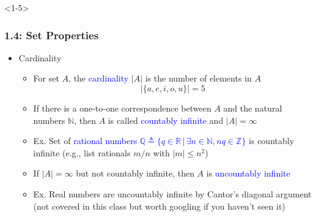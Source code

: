 \documentclass[10pt,english,aspectratio=169]{beamer}
\begin{document}
\iffalse
\begin{frame}{Intervals?}

\begin{itemize}
\setlength\itemsep{3mm}
\item<1-> Defining Sets \vspace{1mm}
\begin{itemize} 
  \setlength\itemsep{1.5mm}


\end{itemize}
\end{itemize}
\end{frame}
\fi

\begin{frame}<1-5> \frametitle{1.4: Set Properties}

\begin{itemize}
\setlength\itemsep{3mm}

\item<1-> Cardinality \vspace{1mm}
\begin{itemize} 
  \setlength\itemsep{2mm}
  \item<1-> For set $A$, the \textcolor{blue}{cardinality} $|A|$ is the number of elements in $A$
  \[ |\{ a,e,i,o,u \}| = 5 \]
  \item<2-> If there is a one-to-one correspondence between $A$ and the natural numbers $\mathbb{N}$, then $A$ is called \textcolor{blue}{countably infinite} and  $|A| = \infty$
  \item<3-> Ex. Set of \textcolor{blue}{rational numbers $\mathbb{Q} \triangleq \{ q \in \mathbb{R} \,|\, \exists n \in \mathbb{N}, nq \in \mathbb{Z} \}$} is countably infinite (e.g., list rationals $m/n$ with $|m|\leq n^2$)
  \item<4-> If $|A| = \infty$ but not countably infinite, then $A$ is \textcolor{blue}{uncountably infinite}
  \item<5-> Ex. Real numbers are uncountably infinite by Cantor's diagonal argument \\ (not covered in this class but worth googling if you haven't seen it)
  

\end{itemize}
\end{itemize}
\end{frame}
\end{document}
